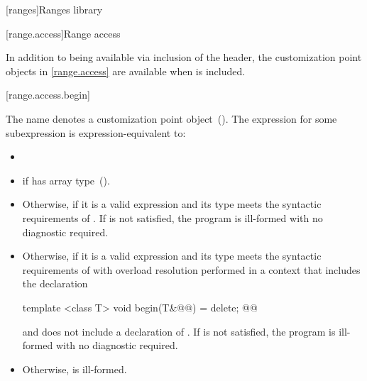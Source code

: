 \setcounter{chapter}{28}
[ranges]{Ranges library}

\setcounter{section}{3}

[range.access]{Range access}

\pnum
In addition to being available via inclusion of the 
header, the customization point objects in \ref{range.access} are
available when  is included.

[range.access.begin]{}

\pnum
The name  denotes a customization point
 object~(). The expression
  for some subexpression  is
 expression-equivalent to:

\begin{itemize}
\item

\item
   if  has array
  type~().

\item
  Otherwise, 
   if it is a valid expression and its
  type  meets the syntactic requirements of . If
   is not satisfied, the program is ill-formed with no
  diagnostic required.

\item
  Otherwise,  if it is a valid expression
  and its type  meets the syntactic requirements of 
  with overload resolution performed in a context that includes the
   declaration
  \begin{codeblock}
  template <class T> void begin(T&@\added{\&}@) = delete;
  @@
  \end{codeblock}
  and does not include a declaration of . If
   is not satisfied, the program is ill-formed with no
  diagnostic required.

\item
  Otherwise,  is ill-formed.
\end{itemize}

